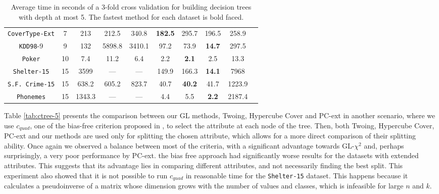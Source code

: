 \begin{table*}[]
\begin{tabular}{c|c|c|c|c|c|c|c|c|c}
{\tt CoverType-Ext} & 7  & 213        & 212.5      & 340.8       &{\bf 182.5}& 295.7      & 196.5      & 258.9      &            \\
{\tt KDD98}-9       & 9  & 132        & 5898.8     & 3410.1      & 97.2      & 73.9       & {\bf 14.7 }& 297.5      &            \\ 
{\tt Poker}         & 10 & 7.4        & 11.2       & 6.4         & 2.2       & {\bf 2.1}  & 2.5        & 13.3       &            \\
{\tt Shelter-15}    & 15 & 3599       & ---        & ---         & 149.9     & 166.3      & {\bf 14.1 }& 7968       &            \\   
{\tt S.F. Crime-15} & 15 & 638.2      & 605.2      & 823.7       & 40.7      & {\bf 40.2} & 41.7       & 1223.9     &            \\ 
{\tt Phonemes}      & 15 & 1343.3     & ---        & ---         & 4.4       & 5.5        & {\bf 2.2 } & 2187.4     &
\end{tabular}
\caption{Average time in seconds of a 3-fold cross validation for building decision trees with depth at most 5. The fastest method for each dataset is bold faced.}
\label{tab:time-5}
\end{table*}



Table \ref{tab:ctree-5} presents the 
comparison between our GL methods, Twoing, Hypercube Cover and PC-ext in another scenario,
where we use $c_{quad}$, one of the bias-free criterion proposed in \cite{Hothorn:2006:URP}, to select the attribute at each node of the tree. 
Then, both Twoing, Hypercube Cover, PC-ext and our methods are  used only for splitting the chosen attribute, which allows for a  more direct comparison of their splitting ability. Once again we observed a balance between most of the criteria, with a significant advantage towards GL-$\chi^2$ and, perhaps surprisingly, a very poor performance by PC-ext. the bias free approach had significantly worse results for the datasets with extended attributes. This suggests that its advantage lies in comparing different attributes, and not necessarily finding the best split. This experiment also showed that it is not possible to run $c_{quad}$ in reasonable time for the {\tt Shelter-15} dataset. This happens because it calculates a pseudoinverse of a matrix whose dimension grows with the number of values and classes, which is infeasible for large $n$ and $k$.



